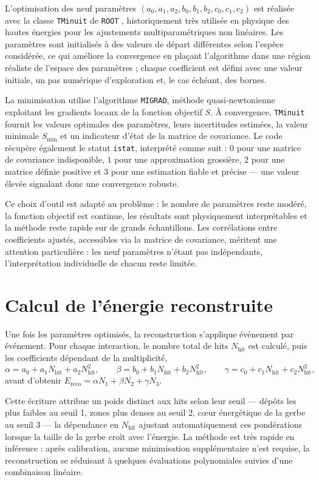 L'optimisation des neuf paramètres \((a_0,a_1,a_2,b_0,b_1,b_2,c_0,c_1,c_2)\) est réalisée avec la classe \texttt{TMinuit} de \texttt{ROOT} \cite{root}, historiquement très utilisée en physique des hautes énergies pour les ajustements multiparamétriques non linéaires. Les paramètres sont initialisés à des valeurs de départ différentes selon l'espèce considérée, ce qui améliore la convergence en plaçant l'algorithme dans une région réaliste de l'espace des paramètres ; chaque coefficient est défini avec une valeur initiale, un pas numérique d'exploration et, le cas échéant, des bornes.

La minimisation utilise l'algorithme \texttt{MIGRAD}, méthode quasi-newtonienne exploitant les gradients locaux de la fonction objectif \(S\). À convergence, \texttt{TMinuit} fournit les valeurs optimales des paramètres, leurs incertitudes estimées, la valeur minimale \(S_{\min}\) et un indicateur d'état de la matrice de covariance. Le code récupère également le statut \texttt{istat}, interprété comme suit : \(0\) pour une matrice de covariance indisponible, \(1\) pour une approximation grossière, \(2\) pour une matrice définie positive et \(3\) pour une estimation fiable et précise — une valeur élevée signalant donc une convergence robuste.

Ce choix d'outil est adapté au problème : le nombre de paramètres reste modéré, la fonction objectif est continue, les résultats sont physiquement interprétables et la méthode reste rapide sur de grands échantillons. Les corrélations entre coefficients ajustés, accessibles via la matrice de covariance, méritent une attention particulière : les neuf paramètres n'étant pas indépendants, l'interprétation individuelle de chacun reste limitée.

\section{Calcul de l'énergie reconstruite}

Une fois les paramètres optimisés, la reconstruction s'applique événement par événement. Pour chaque interaction, le nombre total de hits \(N_{\mathrm{hit}}\) est calculé, puis les coefficients dépendant de la multiplicité,
\[
\alpha = a_0 + a_1 N_{\mathrm{hit}} + a_2 N_{\mathrm{hit}}^2,
\qquad
\beta = b_0 + b_1 N_{\mathrm{hit}} + b_2 N_{\mathrm{hit}}^2,
\qquad
\gamma = c_0 + c_1 N_{\mathrm{hit}} + c_2 N_{\mathrm{hit}}^2,
\]
avant d'obtenir \(E_{\mathrm{reco}}=\alpha N_1+\beta N_2+\gamma N_3\).

Cette écriture attribue un poids distinct aux hits selon leur seuil — dépôts les plus faibles au seuil 1, zones plus denses au seuil 2, cœur énergétique de la gerbe au seuil 3 — la dépendance en \(N_{\mathrm{hit}}\) ajustant automatiquement ces pondérations lorsque la taille de la gerbe croît avec l'énergie. La méthode est très rapide en inférence : après calibration, aucune minimisation supplémentaire n'est requise, la reconstruction se réduisant à quelques évaluations polynomiales suivies d'une combinaison linéaire.

